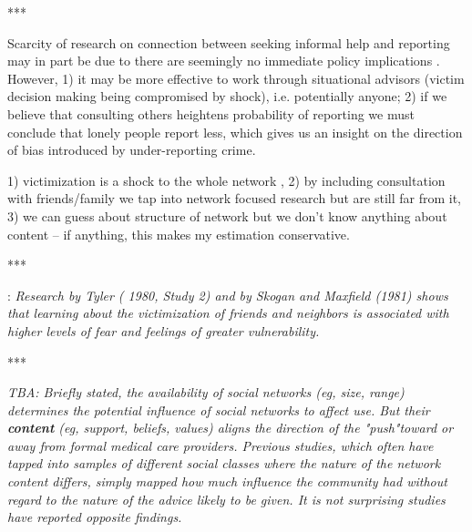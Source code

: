 \documentclass[]{article}
\begin{document}
***






Scarcity of research on connection between seeking informal help and reporting may in part be due to there are seemingly no immediate policy implications \citep{greenberg1992after}. However, 1) it may be more effective to work through situational advisors (victim decision making being compromised by shock), i.e. potentially anyone; 2) if we believe that consulting others heightens probability of reporting we must conclude that lonely people report less, which gives us an insight on the direction of bias introduced by under-reporting crime.

\cite{pescosolido1992beyond} 1) victimization is a shock to the whole network \citep{friedman1982victims}, 2) by including consultation with friends/family we tap into network focused research but are still far from it, 3) we can guess about structure of network but we don't know anything about content -- if anything, this makes my estimation conservative. 





***



\cite{ruback1984social}:
\textit{Research by Tyler ( 1980, Study 2) and by Skogan and Maxfield (1981) shows that learning about the victimization of friends and neighbors is associated with higher levels of fear and feelings of greater vulnerability.}

***

\textit{TBA: \citep{pescosolido1998social}
	Briefly stated, the availability of social networks (eg, size, range) determines the potential influence of social networks to affect use. But their \textbf{content} (eg, support, beliefs, values) aligns the direction of the "push"toward or away from formal medical care providers. Previous studies, which often have tapped into samples of different social classes where the nature of the network content differs, simply mapped how much influence the community had without regard to the nature of the advice likely to be given. It is not surprising studies have reported opposite  findings.}
\end{document}
